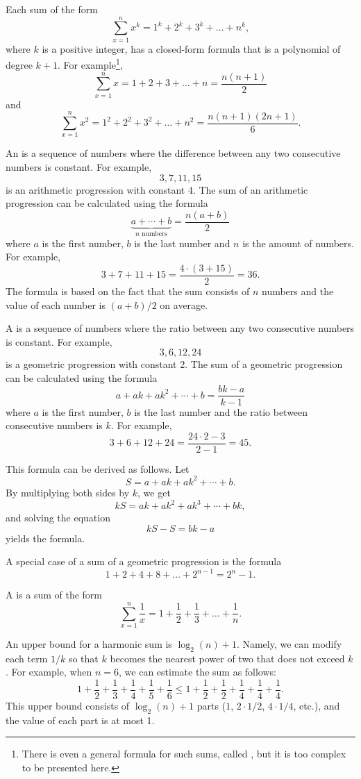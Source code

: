 Each sum of the form
\[\sum_{x=1}^n x^k = 1^k+2^k+3^k+\ldots+n^k,\]
where $k$ is a positive integer,
has a closed-form formula that is a
polynomial of degree $k+1$.
For example\footnote{
There is even a general formula for such sums, called ,
but it is too complex to be presented here.},
\[\sum_{x=1}^n x = 1+2+3+\ldots+n = \frac{n(n+1)}{2}\]
and
\[\sum_{x=1}^n x^2 = 1^2+2^2+3^2+\ldots+n^2 = \frac{n(n+1)(2n+1)}{6}.\]

An  is a 
sequence of numbers
where the difference between any two consecutive
numbers is constant.
For example,
\[3, 7, 11, 15\]
is an arithmetic progression with constant 4.
The sum of an arithmetic progression can be calculated
using the formula
\[\underbrace{a + \cdots + b}_{n \,\, \textrm{numbers}} = \frac{n(a+b)}{2}\]
where $a$ is the first number,
$b$ is the last number and
$n$ is the amount of numbers.
For example,
\[3+7+11+15=\frac{4 \cdot (3+15)}{2} = 36.\]
The formula is based on the fact
that the sum consists of $n$ numbers and
the value of each number is $(a+b)/2$ on average.

A  is a sequence
of numbers
where the ratio between any two consecutive
numbers is constant.
For example,
\[3,6,12,24\]
is a geometric progression with constant 2.
The sum of a geometric progression can be calculated
using the formula
\[a + ak + ak^2 + \cdots + b = \frac{bk-a}{k-1}\]
where $a$ is the first number,
$b$ is the last number and the
ratio between consecutive numbers is $k$.
For example,
\[3+6+12+24=\frac{24 \cdot 2 - 3}{2-1} = 45.\]

This formula can be derived as follows. Let
\[ S = a + ak + ak^2 + \cdots + b .\]
By multiplying both sides by $k$, we get
\[ kS = ak + ak^2 + ak^3 + \cdots + bk,\]
and solving the equation
\[ kS-S = bk-a\]
yields the formula.

A special case of a sum of a geometric progression is the formula
\[1+2+4+8+\ldots+2^{n-1}=2^n-1.\]


A  is a sum of the form
\[ \sum_{x=1}^n \frac{1}{x} = 1+\frac{1}{2}+\frac{1}{3}+\ldots+\frac{1}{n}.\]

An upper bound for a harmonic sum is $\log_2(n)+1$.
Namely, we can
modify each term $1/k$ so that $k$ becomes
the nearest power of two that does not exceed $k$.
For example, when $n=6$, we can estimate
the sum as follows:
\[ 1+\frac{1}{2}+\frac{1}{3}+\frac{1}{4}+\frac{1}{5}+\frac{1}{6} \le
1+\frac{1}{2}+\frac{1}{2}+\frac{1}{4}+\frac{1}{4}+\frac{1}{4}.\]
This upper bound consists of $\log_2(n)+1$ parts
($1$, $2 \cdot 1/2$, $4 \cdot 1/4$, etc.),
and the value of each part is at most 1.

